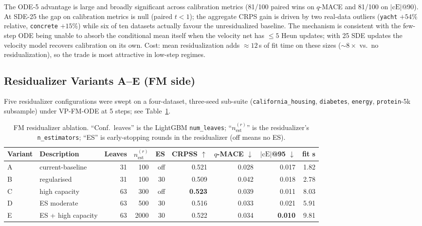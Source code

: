 \documentclass{uai2026}
\begin{document}
The ODE-5 advantage is large and broadly significant across calibration metrics (81/100 paired wins on $q$-MACE and 81/100 on $|\text{cE}|$@90). At SDE-25 the gap on calibration metrics is null (paired $t<1$); the aggregate CRPS gain is driven by two real-data outliers (\texttt{yacht} $+54\%$ relative, \texttt{concrete} $+15\%$) while six of ten datasets actually favour the unresidualized baseline. The mechanism is consistent with the few-step ODE being unable to absorb the conditional mean itself when the velocity net has $\leq 5$ Heun updates; with 25 SDE updates the velocity model recovers calibration on its own. Cost: mean residualization adds $\approx 12$\,s of fit time on these sizes ($\sim 8\times$ vs.\ no residualization), so the trade is most attractive in low-step regimes.

\subsection{Residualizer Variants A--E (FM side)}\label{app:resid-AE}

Five residualizer configurations were swept on a four-dataset, three-seed sub-suite (\texttt{california\_housing}, \texttt{diabetes}, \texttt{energy}, \texttt{protein}-5k subsample) under VP-FM-ODE at 5 steps; see Table~\ref{tab:resid-AE}.

\begin{table}[!h]
  \centering
  \caption{FM residualizer ablation. ``Conf.\ leaves'' is the LightGBM \texttt{num\_leaves}; ``$n_{\text{est}}^{(r)}$'' is the residualizer's \texttt{n\_estimators}; ``ES'' is early-stopping rounds in the residualizer (off means no ES).}\label{tab:resid-AE}
  \footnotesize
  \begin{tabular}{llrrrrrrr}
    \toprule
    Variant & Description & Leaves & $n_{\text{est}}^{(r)}$ & ES & CRPSS $\uparrow$ & $q$-MACE $\downarrow$ & $|\text{cE}|$@95 $\downarrow$ & fit s \\
    \midrule
    A & current-baseline   & 31 & 100 & off & 0.521 & 0.028 & 0.017 & 1.82 \\
    B & regularised        & 31 & 100 & 30  & 0.509 & 0.042 & 0.018 & 2.78 \\
    C & high capacity      & 63 & 300 & off & \textbf{0.523} & 0.039 & 0.011 & 8.03 \\
    D & ES moderate        & 63 & 500 & 30  & 0.516 & 0.033 & 0.021 & 5.91 \\
    E & ES + high capacity & 63 & 2000& 30  & 0.522 & 0.034 & \textbf{0.010} & 9.81 \\
    \bottomrule
  \end{tabular}
\end{table}
\end{document}
